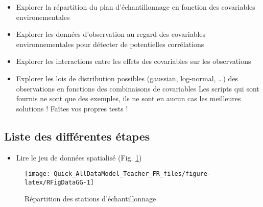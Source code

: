\documentclass[french,a4paper]{article}
\providecommand{\tightlist}{%
  \setlength{\itemsep}{0pt}\setlength{\parskip}{0pt}}
\begin{document}
\begin{itemize}
\tightlist
\item
  Explorer la répartition du plan d'échantillonnage en fonction des
  covariables environementales
\item
  Explorer les données d'observation au regard des covariables
  environnementales pour détecter de potentielles corrélations
\item
  Explorer les interactions entre les effets des covariables sur les
  observations
\item
  Explorer les lois de distribution possibles (gaussian, log-normal,
  \ldots{}) des observations en fonctions des combinaisons de
  covariables \nopandoc{\begin{redbox}} Les scripts qui sont fournis ne
  sont que des exemples, ils ne sont en aucun cas les meilleures
  solutions ! Faîtes vos propres tests ! \nopandoc{\end{redbox}}
\end{itemize}

\hypertarget{liste-des-differentes-etapes}{%
\subsection{Liste des différentes
étapes}\label{liste-des-differentes-etapes}}

\begin{itemize}
\tightlist
\item
  Lire le jeu de données spatialisé (Fig. \ref{fig:RFigDataGG})
\end{itemize}



\begin{figure}[!h]

{\centering \texttt{[image: Quick\_AllDataModel\_Teacher\_FR\_files/figure-latex/RFigDataGG-1]} 

}

\caption{Répartition des stations d'échantillonnage}\label{fig:RFigDataGG}
\end{figure}
\end{document}
